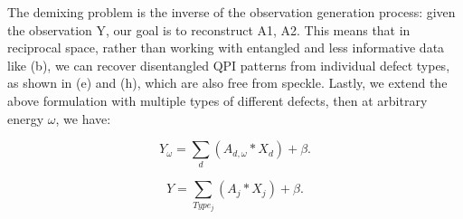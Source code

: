 The demixing problem is the inverse of the observation generation process: given the observation Y, our goal is to reconstruct A1, A2. This means that in reciprocal space, rather than working with entangled and less informative data like (b), we can recover disentangled QPI patterns from individual defect types, as shown in (e) and (h), which are also free from speckle. Lastly, we extend the above formulation with multiple types of different defects, then at arbitrary energy $\omega$, we have: 

\begin{equation}
	\label{eq:demixing}
	Y_{\omega} = \sum_d ( A_{d,{\omega}} * X_d) + \beta. 
\end{equation} 

\begin{equation}
	Y = \sum_{Type_j} ( A_{j} * X_j) + \beta. 
\end{equation} 

